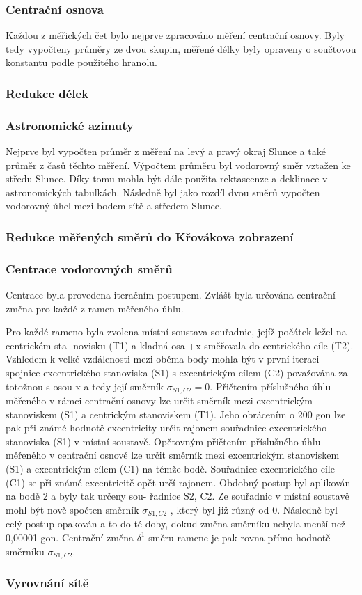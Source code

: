 
\subsubsection{Centrační osnova}
\tab Každou z měřických čet bylo nejprve zpracováno měření centrační osnovy. Byly tedy vypočteny
průměry ze dvou skupin, měřené délky byly opraveny o součtovou konstantu podle použitého
hranolu.


\subsubsection{Redukce délek}



\subsubsection{Astronomické azimuty}
\tab Nejprve byl vypočten průměr z měření na levý a pravý okraj Slunce a také průměr z časů těchto
měření. Výpočtem průměru byl vodorovný směr vztažen ke středu Slunce. Díky tomu mohla být
dále použita rektascenze a deklinace v astronomických tabulkách. Následně byl jako rozdíl dvou směrů vypočten vodorovný úhel mezi bodem sítě a středem Slunce.


\subsubsection{Redukce měřených směrů do Křovákova zobrazení}



\subsubsection{Centrace vodorovných směrů}
\tab Centrace byla provedena iteračním postupem. Zvlášť byla určována centrační změna pro každé
z ramen měřeného úhlu.

Pro každé rameno byla zvolena místní soustava souřadnic, jejíž počátek ležel na centrickém sta-
novisku (T1) a kladná osa +x směřovala do centrického cíle (T2). Vzhledem k velké vzdálenosti
mezi oběma body mohla být v první iteraci spojnice excentrického stanoviska (S1) s excentrickým
cílem (C2) považována za totožnou s osou x a tedy její směrník $\sigma_{S1,C2} = 0$. Přičtením příslušného úhlu měřeného v rámci centrační osnovy lze určit směrník mezi excentrickým stanoviskem (S1) a centrickým stanoviskem (T1). Jeho obrácením o 200 gon lze pak při známé hodnotě excentricity
určit rajonem souřadnice excentrického stanoviska (S1) v místní soustavě. Opětovným přičtením
příslušného úhlu měřeného v centrační osnově lze určit směrník mezi excentrickým stanoviskem
(S1) a excentrickým cílem (C1) na témže bodě. Souřadnice excentrického cíle (C1) se při známé
excentricitě opět určí rajonem. Obdobný postup byl aplikován na bodě 2 a byly tak určeny sou-
řadnice S2, C2. Ze souřadnic v místní soustavě mohl být nově spočten směrník $\sigma_{S1,C2}$ , který byl již různý od 0. Následně byl celý postup opakován a to do té doby, dokud změna směrníku nebyla
menší než 0,00001 gon. Centrační změna $\delta^1$ směru ramene je pak rovna přímo hodnotě směrníku
$\sigma_{S1,C2}$.



\subsubsection{Vyrovnání sítě}
